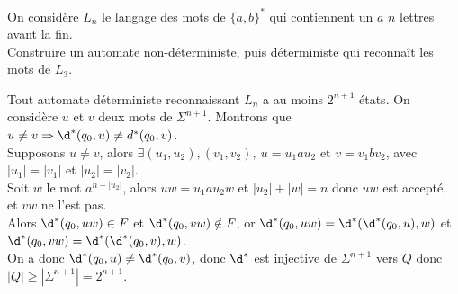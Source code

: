 \documentclass[french, 11pt]{article}
\renewcommand*{\S}{\Sigma}
\renewcommand*{\ra}{\Rightarrow}
\begin{document}
\vspace*{0.3cm}

\begin{ex}{}{}
    On considère $L_n$ le langage des mots de $\{a,b\}^*$ qui contiennent un $a$ $n$ lettres avant la fin.\\
    Construire un automate non-déterministe, puis déterministe qui reconnaît les mots de $L_3$.
    \tcblower
    \phantom{a}
    \begin{center}
    \end{center}
\end{ex}

\vspace*{0.3cm}

\begin{prop}{}{}
    Tout automate déterministe reconnaissant $L_n$ a au moins $2^{n+1}$ états.
    \tcblower
    On considère $u$ et $v$ deux mots de $\S^{n+1}$. Montrons que $u\neq v \ra \d^*(q_0,u)\neq d^*(q_0,v)$.\\
    Supposons $u\neq v$, alors $\exists (u_1,u_2),(v_1,v_2), ~ u=u_1au_2$ et $v=v_1bv_2$, avec $|u_1|=|v_1|$ et $|u_2|=|v_2|$.\\
    Soit $w$ le mot $a^{n-|u_2|}$, alors $uw=u_1au_2w$ et $|u_2|+|w|=n$ donc $uw$ est accepté, et $vw$ ne l'est pas.\\
    Alors $\d^*(q_0,uw)\in F$ et $\d^*(q_0,vw)\notin F$, or $\d^*(q_0,uw)=\d^*(\d^*(q_0,u),w)$ et $\d^*(q_0,vw)=\d^*(\d^*(q_0,v),w)$.\\
    On a donc $\d^*(q_0,u)\neq\d^*(q_0,v)$, donc $\d^*$ est injective de $\S^{n+1}$ vers $Q$ donc $|Q|\geq|\S^{n+1}|=2^{n+1}$.
\end{prop}

\vspace*{0.3cm}
\end{document}
